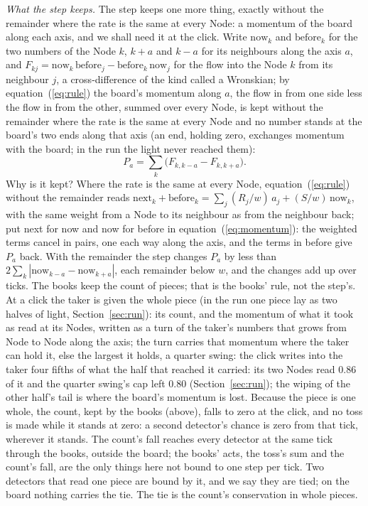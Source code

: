 \documentclass[pdflatex,sn-mathphys-num]{sn-jnl}
\begin{document}
\textit{What the step keeps.} The step keeps one more thing, exactly without the remainder where the rate is the same at every Node: a momentum of the board along each axis, and we shall need it at the click. Write $\mathrm{now}_k$ and $\mathrm{before}_k$ for the two numbers of the Node $k$, $k+a$ and $k-a$ for its neighbours along the axis $a$, and $F_{kj} = \mathrm{now}_k\,\mathrm{before}_j - \mathrm{before}_k\,\mathrm{now}_j$ for the flow into the Node $k$ from its neighbour $j$, a cross-difference of the kind called a Wronskian; by equation~(\ref{eq:rule}) the board's momentum along $a$, the flow in from one side less the flow in from the other, summed over every Node, is kept without the remainder where the rate is the same at every Node and no number stands at the board's two ends along that axis (an end, holding zero, exchanges momentum with the board; in the run the light never reached them):
\begin{equation}\label{eq:momentum}
P_a = \sum_k \big(F_{k,k-a} - F_{k,k+a}\big).
\end{equation}
Why is it kept? Where the rate is the same at every Node, equation~(\ref{eq:rule}) without the remainder reads $\mathrm{next}_k + \mathrm{before}_k = \sum_j (R_j/w)\,a_j + (S/w)\,\mathrm{now}_k$, with the same weight from a Node to its neighbour as from the neighbour back; put next for now and now for before in equation~(\ref{eq:momentum}): the weighted terms cancel in pairs, one each way along the axis, and the terms in before give $P_a$ back. With the remainder the step changes $P_a$ by less than $2\sum_k |\mathrm{now}_{k-a} - \mathrm{now}_{k+a}|$, each remainder below $w$, and the changes add up over ticks. The books keep the count of pieces; that is the books' rule, not the step's. At a click the taker is given the whole piece (in the run one piece lay as two halves of light, Section~\ref{sec:run}): its count, and the momentum of what it took as read at its Nodes, written as a turn of the taker's numbers that grows from Node to Node along the axis; the turn carries that momentum where the taker can hold it, else the largest it holds, a quarter swing: the click writes into the taker four fifths of what the half that reached it carried: its two Nodes read 0.86 of it and the quarter swing's cap left 0.80 (Section~\ref{sec:run}); the wiping of the other half's tail is where the board's momentum is lost. Because the piece is one whole, the count, kept by the books (above), falls to zero at the click, and no toss is made while it stands at zero: a second detector's chance is zero from that tick, wherever it stands. The count's fall reaches every detector at the same tick through the books, outside the board; the books' acts, the toss's sum and the count's fall, are the only things here not bound to one step per tick. Two detectors that read one piece are bound by it, and we say they are tied; on the board nothing carries the tie. The tie is the count's conservation in whole pieces.
\end{document}
